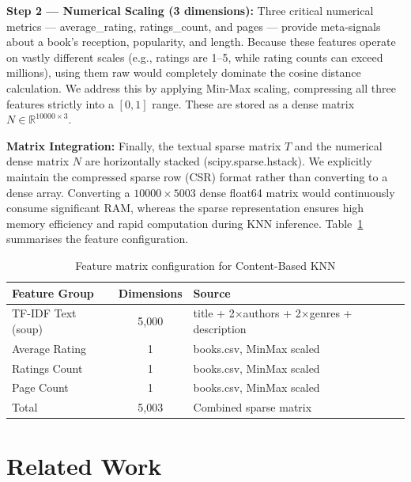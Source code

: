 \documentclass[12pt, a4paper]{article}
\begin{document}
\textbf{Step 2 --- Numerical Scaling (3 dimensions):}
Three critical numerical metrics --- average\_rating, ratings\_count,
and pages --- provide meta-signals about a book's reception, popularity, and length. Because these features operate on vastly different scales (e.g., ratings are 1--5, while rating counts can exceed millions), using them raw would completely dominate the cosine distance calculation. We address this by applying Min-Max scaling, compressing all three features strictly into a $[0, 1]$ range. These are stored as a dense matrix $N \in \mathbb{R}^{10000 \times 3}$.

\textbf{Matrix Integration:}
Finally, the textual sparse matrix $T$ and the numerical dense matrix $N$ are horizontally stacked (scipy.sparse.hstack). We explicitly maintain the compressed sparse row (CSR) format rather than converting to a dense array. Converting a $10000 \times 5003$ dense float64 matrix would continuously consume significant RAM, whereas the sparse representation ensures high memory efficiency and rapid computation during KNN inference.
Table~\ref{tab:features} summarises the feature configuration.

\begin{table}[H]
  \centering
  \caption{Feature matrix configuration for Content-Based KNN}
  \label{tab:features}
  \begin{tabular}{|l|c|p{6cm}|}
    \hline
    \textbf{Feature Group} & \textbf{Dimensions} & \textbf{Source} \\
    \hline
    TF-IDF Text (soup)    & 5,000 & title + 2$\times$authors + 2$\times$genres + description \\
    \hline
    Average Rating        & 1     & books.csv, MinMax scaled \\
    \hline
    Ratings Count         & 1     & books.csv, MinMax scaled \\
    \hline
    Page Count            & 1     & books.csv, MinMax scaled \\
    \hline
    Total        & 5,003 & Combined sparse matrix \\
    \hline
  \end{tabular}
\end{table}

\newpage
\section{Related Work}
\label{sec:related}
\end{document}
